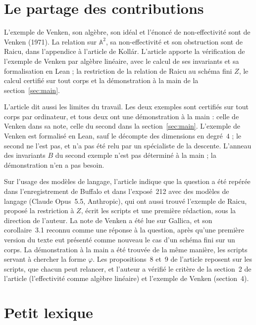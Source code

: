 \documentclass[11pt,a4paper]{amsart}
\theoremstyle{definition}
\theoremstyle{plain}
\theoremstyle{remark}
\newcommand{\A}{\mathbb A}
\begin{document}
\section{Le partage des contributions}

L'exemple de Venken, son algèbre, son idéal et l'énoncé de non-effectivité sont de Venken (1971). La relation sur $\A^2$, sa non-effectivité et son obstruction sont de Raicu, dans l'appendice à l'article de Kollár. L'article apporte la vérification de l'exemple de Venken par algèbre linéaire, avec le calcul de ses invariants et sa formalisation en Lean ; la restriction de la relation de Raicu au schéma fini $Z$, le calcul certifié sur tout corps et la démonstration à la main de la section~\ref{sec:main}.

L'article dit aussi les limites du travail. Les deux exemples sont certifiés sur tout corps par ordinateur, et tous deux ont une démonstration à la main : celle de Venken dans sa note, celle du second dans la section~\ref{sec:main}. L'exemple de Venken est formalisé en Lean, sauf le décompte des dimensions en degré~$4$ ; le second ne l'est pas, et n'a pas été relu par un spécialiste de la descente. L'anneau des invariants $B$ du second exemple n'est pas déterminé à la main ; la démonstration n'en a pas besoin.

Sur l'usage des modèles de langage, l'article indique que la question a été repérée dans l'enregistrement de Buffalo et dans l'exposé~212 avec des modèles de langage (Claude Opus~5.5, Anthropic), qui ont aussi trouvé l'exemple de Raicu, proposé la restriction à $Z$, écrit les scripts et une première rédaction, sous la direction de l'auteur. La note de Venken a été lue sur Gallica, et son corollaire~3.1 reconnu comme une réponse à la question, après qu'une première version du texte eut présenté comme nouveau le cas d'un schéma fini sur un corps. La démonstration à la main a été trouvée de la même manière, les scripts servant à chercher la forme $\varphi$. Les propositions~8 et~9 de l'article reposent sur les scripts, que chacun peut relancer, et l'auteur a vérifié le critère de la section~2 de l'article (l'effectivité comme algèbre linéaire) et l'exemple de Venken (section~4).

\section{Petit lexique}
\end{document}
